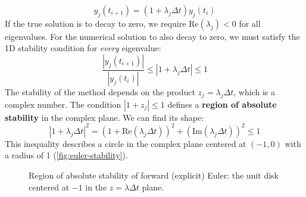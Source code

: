 \begin{equation}
    y_j(t_{i+1}) = (1 + \lambda_j \Delta t) y_j(t_i)
\end{equation}
If the true solution is to decay to zero, we require $\text{Re}(\lambda_j) < 0$ for all eigenvalues. For the numerical solution to also decay to zero, we must satisfy the 1D stability condition for \textit{every} eigenvalue:
\begin{equation}
    \frac{|y_j(t_{i+1})|}{|y_j(t_i)|} \le |1 + \lambda_j \Delta t| \le 1
\end{equation}
The stability of the method depends on the product $z_j = \lambda_j \Delta t$, which is a complex number. The condition $|1 + z_j| \le 1$ defines a \textbf{region of absolute stability} in the complex plane. We can find its shape:
\begin{equation}
    |1 + \lambda_j \Delta t|^2 = (1 + \text{Re}(\lambda_j \Delta t))^2 + (\text{Im}(\lambda_j \Delta t))^2 \le 1
\end{equation}
This inequality describes a circle in the complex plane centered at $(-1, 0)$ with a radius of 1 (\autoref{fig:euler-stability}).

\begin{figure}[htbp]
    \begin{center}
    \end{center}
    \caption{Region of absolute stability of forward (explicit) Euler: the unit disk centered at $-1$ in the $z=\lambda\Delta t$ plane.}\label{fig:euler-stability}
\end{figure}

